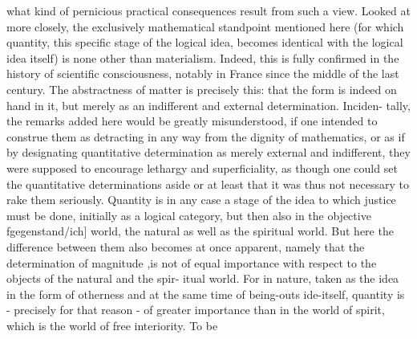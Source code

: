 what kind of pernicious practical consequences result from such a view. Looked at
more closely, the exclusively mathematical standpoint mentioned here (for which
quantity, this specific stage of the logical idea, becomes identical with the logical
idea itself) is none other than materialism. Indeed, this is fully confirmed in the
history of scientific consciousness, notably in France since the middle of the last
century. The abstractness of matter is precisely this: that the form is indeed on
hand in it, but merely as an indifferent and external determination. Inciden-
tally, the remarks added here would be greatly misunderstood, if one intended to
construe them as detracting in any way from the dignity of mathematics, or as if
by designating quantitative determination as merely external and indifferent, they
were supposed to encourage lethargy and superficiality, as though one could set the
quantitative determinations aside or at least that it was thus not necessary to rake
them seriously. Quantity is in any case a stage of the idea to which justice must be
done, initially as a logical category, but then also in the objective fgegenstand/ich]
world, the natural as well as the spiritual world. But here the difference between
them also becomes at once apparent, namely that the determination of magnitude
,is not of equal importance with respect to the objects of the natural and the spir-
itual world. For in nature, taken as the idea in the form of otherness and at the
same time of being-outs ide-itself, quantity is - precisely for that reason - of greater importance than in the world of spirit, which is the world of free interiority. To be
